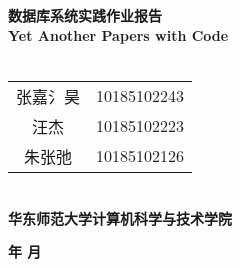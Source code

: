\documentclass[bachelor]{ustcthesis}
\newcommand{\docname}{数据库系统实践作业报告}
\begin{document}
    \begin{titlepage}
    \begin{center}
        ~\\[2cm]
        ~\\[0.4cm]
        {\Huge \bfseries \docname\\Yet Another Papers with Code}\\[0.4cm]
        ~\\[1.5cm]
        \begin{tabular}{cc}
            张嘉氵昊 & 10185102243\\
            汪杰 & 10185102223\\
            朱张弛 & 10185102126\\
        \end{tabular} \\[5cm]
        {\large \bfseries 华东师范大学计算机科学与技术学院}
        
        {\large \bfseries \number\year 年 \number\month 月 }
    \end{center}
    \end{titlepage}
    
    \frontmatter
    \tableofcontents
    \mainmatter
    
    
    
    
    
    
    
    
    
    
    
\end{document}
